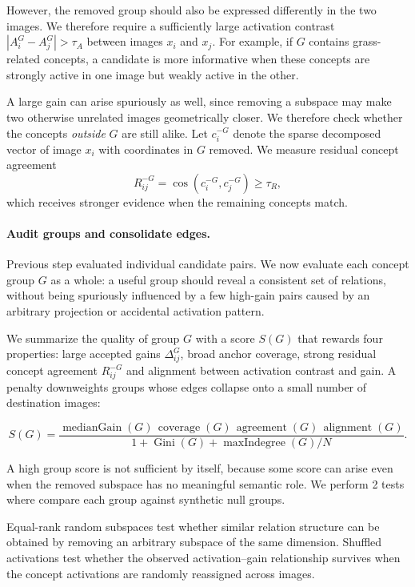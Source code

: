 \documentclass{article}
\begin{document}
However, the removed group should also be expressed differently in the two images. We therefore require a sufficiently large activation contrast $|A_i^G-A_j^G| > \tau_A $ between images $x_i$ and $x_j$. For example, if $G$ contains grass-related concepts, a candidate is more informative when these concepts are strongly active in one image but weakly active in the other.

A large gain can arise spuriously as well, since removing a subspace may make two otherwise unrelated images geometrically closer. We therefore check whether the concepts \emph{outside} $G$ are still alike. Let $c_i^{-G}$ denote the sparse decomposed vector of image $x_i$ with coordinates in $G$ removed. We measure residual concept agreement
\[
R_{ij}^{-G}
=
\cos(c_i^{-G},c_j^{-G})
\geq \tau_R,
\]
which receives stronger evidence when the remaining concepts match.

\paragraph{Audit groups and consolidate edges.}
Previous step evaluated individual candidate pairs. We now evaluate each concept group $G$ as a whole: a useful group should reveal a consistent set of relations, without being spuriously influenced by a few high-gain pairs caused by an arbitrary projection or accidental activation pattern.

We summarize the quality of group $G$ with a score $S(G)$ that rewards
four properties: large accepted gains $\Delta_{ij}^{G}$, broad anchor coverage, strong residual concept agreement $R_{ij}^{-G}$ and alignment between activation contrast and gain. A penalty downweights groups whose edges collapse onto a small number of destination images:

\begin{equation}
S(G)
=
\frac{
\operatorname{medianGain}(G)\,
\operatorname{coverage}(G)\,
\operatorname{agreement}(G)\,
\operatorname{alignment}(G)
}{
1+\operatorname{Gini}(G)+\operatorname{maxIndegree}(G)/N
}.
\end{equation}

A high group score is not sufficient by itself, because some score can arise
even when the removed subspace has no meaningful semantic role. We perform 2 tests where compare each group against synthetic null groups.

Equal-rank random subspaces test whether similar relation structure can be obtained by removing an arbitrary subspace of the same dimension. Shuffled activations test whether the observed activation--gain relationship survives when the concept activations are randomly reassigned across images.
\end{document}
